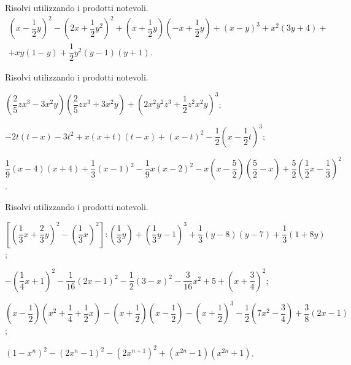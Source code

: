 \begin{esercizio}[\Ast]
Risolvi utilizzando i prodotti notevoli.
\begin{multline*}
\left(x-\dfrac{1}{2}y\right)^{2}-\left(2x+\dfrac{1}{2}y^{2}\right)^{2}+\left(x+\dfrac{1}{2}y\right)\left(-x+\dfrac{1}{2}y\right)+(x-y)^{3}+x^{2}(3y+4)+\\
+xy(1-y)+\dfrac{1}{2}y^{2}(y-1)(y+1).
\end{multline*}
\end{esercizio}

\begin{esercizio}
Risolvi utilizzando i prodotti notevoli.
 \begin{enumeratea}
 \item $\left(\dfrac{2}{5}zx^{3}-3x^{2}y\right)\left(\dfrac{2}{5}zx^{3}+3x^{2}y\right)+\left(2x^{2}y^{2}z^{3}+\dfrac{1}{2}z^{2}x^{2}y\right)^{3}$;
 \item $-2t(t-x)-3t^{2}+x(x+t)(t-x)+(x-t)^{2}-\dfrac{1}{2}\left(x-\dfrac{1}{2}t\right)^{3}$;
 \item $\dfrac{1}{9}(x-4)(x+4)+\dfrac{1}{3}(x-1)^{2}-\dfrac{1}{9}x(x-2)^{2}-x\left(x-\dfrac{5}{2}\right)\left(\dfrac{5}{2}-x\right)+\dfrac{5}{2}\left(\dfrac{1}{2}x-\dfrac{1}{3}\right)^{2}$.
 \end{enumeratea}
\end{esercizio}

\begin{esercizio}[\Ast]
Risolvi utilizzando i prodotti notevoli.
 \begin{enumeratea}
 \item $\left[\left(\dfrac{1}{3}x+\dfrac{2}{3}y\right)^{2}-\left(\dfrac{1}{3}x\right)^{2}\right]:\left(\dfrac{1}{3}y\right)+\left(\dfrac{1}{3}y-1\right)^{3}+\dfrac{1}{3}(y-8)(y-7)+\dfrac{1}{3}(1+8y)$;
 \item $-\left(\dfrac{1}{4}x+1\right)^{2}-\dfrac{1}{16}(2x-1)^{2}-\dfrac{1}{2}(3-x)^{2}-\dfrac{3}{16}x^{2}+5+\left(x+\dfrac{3}{4}\right)^{2}$;
 \item $\left(x-\dfrac{1}{2}\right)\left(x^{2}+\dfrac{1}{4}+\dfrac{1}{2}x\right)-\left(x+\dfrac{1}{2}\right)\left(x-\dfrac{1}{2}\right)-\left(x+\dfrac{1}{2}\right)^{3}-\dfrac{1}{2}\left(7x^{2}-\dfrac{3}{4}\right)+\dfrac{3}{8}(2x-1)$;
 \item $\left(1-x^{n}\right)^{2}-\left(2x^{n}-1\right)^{2}-\left(2x^{n+1}\right)^{2}+\left(x^{2n}-1\right)\left(x^{2n}+1\right)$.
 \end{enumeratea}
\end{esercizio}

